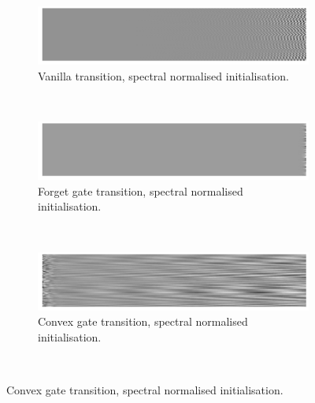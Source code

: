\begin{figure}
\begin{subfigure}[t]{0.3\textwidth}
\includegraphics[width=\textwidth]{appendix/init/vanillaspec}
\caption{Vanilla transition, spectral normalised initialisation.}
\end{subfigure}~
\begin{subfigure}[t]{0.3\textwidth}
\includegraphics[width=\textwidth]{appendix/init/lstmspec}
\caption{Forget gate transition, spectral normalised initialisation.}
\end{subfigure}~
\begin{subfigure}[t]{0.3\textwidth}
\includegraphics[width=\textwidth]{appendix/init/gruspec}
\caption{Convex gate transition, spectral normalised initialisation.}
\end{subfigure}\\


\end{figure}
